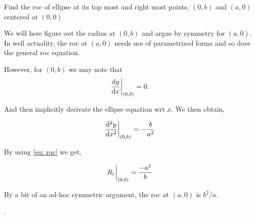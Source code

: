\begin{example}
    Find the roc of ellipse at its top most and right most points, \((0,b)\) and \((a, 0)\) centered 
    at \((0,0)\)

    \begin{soln}
        We will here figure out the radius at \((0,b)\) and argue by symmetry for \((a,0)\).
        In well actuality, the roc at \((a, 0)\) needs use of parametrized forms and 
        so does the general roc equation.

        However, for \((0,b)\) we may note that \[\eval{\dv{y}{x}}_{(0, b)}=0.\]
        
        And then implicitly derivate the ellipse equation wrt \(x\). We then obtain,
        
        \begin{equation*}
            \eval{\dv[2]{y}{x}}_{(0,b)} = -\frac{b}{a^2} 
        \end{equation*}

        By using \eqref{eq: roc} we get,

        \begin{equation}
            \eval{R_c}_{(0,b)} = \frac{-a^2}{b}
        \end{equation}

        By a bit of an ad-hoc symmetric argument, the roc at \((a, 0)\) is 
        \(b^2/a\).
    \end{soln} 
\end{example}

.